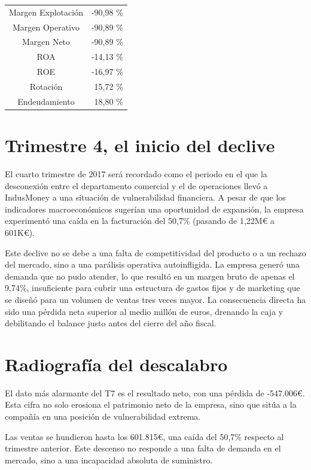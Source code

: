 \begin{table}[h]
    \centering
    \begin{tabular}{|c|r|}
        \hline
        Margen Explotación  & -90,98 \% \\
        Margen Operativo    & -90,89 \% \\
        Margen Neto         & -90,89 \% \\
        ROA                 & -14,13 \% \\
        ROE                 & -16,97 \% \\
        Rotación            & 15,72 \% \\
        Endeudamiento       & 18,80 \% \\
        \hline
    \end{tabular}
\end{table}

\section*{Trimestre 4, el inicio del declive}
El cuarto trimestre de 2017 será recordado como el periodo en el que la desconexión entre el departamento comercial y el de operaciones llevó a IndusMoney a una situación de vulnerabilidad financiera. A pesar de que los indicadores macroeconómicos sugerían una oportunidad de expansión, la empresa experimentó una caída en la facturación del 50,7\% (pasando de 1,22M€ a 601K€). 

Este declive no se debe a una falta de competitividad del producto o a un rechazo del mercado, sino a una parálisis operativa autoinfligida. La empresa generó una demanda que no pudo atender, lo que resultó en un margen bruto de apenas el 9,74\%, insuficiente para cubrir una estructura de gastos fijos y de marketing que se diseñó para un volumen de ventas tres veces mayor. La consecuencia directa ha sido una pérdida neta superior al medio millón de euros, drenando la caja y debilitando el balance justo antes del cierre del año fiscal. 

\section*{Radiografía del descalabro}
El dato más alarmante del T7 es el resultado neto, con una pérdida de -547.006€. Esta cifra no solo erosiona el patrimonio neto de la empresa, sino que sitúa a la compañía en una posición de vulnerabilidad extrema. 

Las ventas se hundieron hasta los 601.815€, una caída del 50,7\% respecto al trimestre anterior. Este descenso no responde a una falta de demanda en el mercado, sino a una incapacidad absoluta de suministro. 


